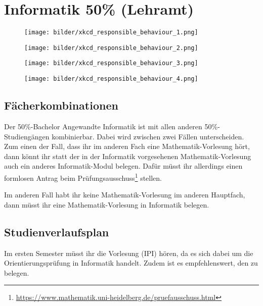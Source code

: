 \section{Informatik 50\% (Lehramt)}

\begin{figure*}[t]
    \centering
    \begin{subfigure}{.24\textwidth}
        \centering
        \texttt{[image: bilder/xkcd\_responsible\_behaviour\_1.png]}
    \end{subfigure}
    \begin{subfigure}{.24\textwidth}
        \centering
        \texttt{[image: bilder/xkcd\_responsible\_behaviour\_2.png]}
    \end{subfigure}
    \begin{subfigure}{.25\textwidth}
        \centering
        \texttt{[image: bilder/xkcd\_responsible\_behaviour\_3.png]}
    \end{subfigure}
    \begin{subfigure}{.25\textwidth}
        \centering
        \texttt{[image: bilder/xkcd\_responsible\_behaviour\_4.png]}
    \end{subfigure}
\end{figure*}

\subsection{Fächerkombinationen}
Der 50\%-Bachelor Angewandte Informatik ist mit allen anderen 50\%-Studiengängen kombinierbar. Dabei wird zwischen zwei Fällen unterscheiden. Zum einen der Fall, dass ihr im anderen Fach eine Mathematik-Vorlesung hört, dann könnt ihr statt der in der Informatik vorgesehenen Mathematik-Vorlesung auch ein anderes Informatik-Modul belegen. Dafür müsst ihr allerdings einen formlosen Antrag beim Prüfungsausschuss\footnote{\url{https://www.mathematik.uni-heidelberg.de/pruefausschuss.html}} stellen.

Im anderen Fall habt ihr keine Mathematik-Vorlesung im anderen Hauptfach, dann müsst ihr eine Mathematik-Vorlesung in Informatik belegen.

\subsection{Studienverlaufsplan}
Im ersten Semester müsst ihr die Vorlesung  (\gls{IPI}) hören, da es sich dabei um die Orientierungsprüfung in Informatik handelt. Zudem ist es empfehlenswert, den  zu belegen.

